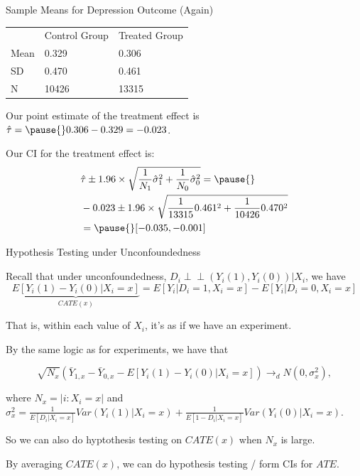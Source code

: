 \documentclass[11pt,english,handout]{beamer}
\newenvironment{wideitemize}{\itemize\addtolength{\itemsep}{10pt}}{\enditemize}
\newcommand{\indep}{\perp\!\!\!\!\perp}
\begin{document}
\begin{frame}{Sample Means for Depression Outcome (Again)}
	
	\begin{tabular}{lll}
		& Control Group & Treated Group \\
		Mean & 0.329 & 0.306\\
		SD & 0.470 &  0.461 \\
		N & 10426 & 13315  
	\end{tabular}
	
	\pause
	\begin{wideitemize}
		\item
		Our point estimate of the treatment effect is $\hat\tau = \pause{} 0.306 - 0.329 = -0.023$.
		
		\pause
		\item
		Our CI for the treatment effect is: 
		\pause
		\begin{align*}
		&\hat\tau \pm 1.96 \times \sqrt{  \frac{1}{N_1}  \hat\sigma_1^2 + \frac{1}{N_0}  \hat\sigma_0^2  } = \pause{} \\ &-0.023 \pm 1.96 \times \sqrt{ \frac{1}{13315} 0.461^2 +  \frac{1}{10426} 0.470^2 } \\ &=  \pause{} [-0.035, -0.001] 
		\end{align*}
		
	\end{wideitemize}
	
\end{frame}




\begin{frame}{Hypothesis Testing under Unconfoundedness}
\begin{wideitemize}
\item
Recall that under unconfoundedness, $D_i \indep (Y_i(1),Y_i(0)) | X_i$, we have
$$ \underbrace{E[Y_i(1) - Y_i(0) | X_i =x]}_{CATE(x)} = E[Y_i | D_i = 1, X_i =x ] - E[Y_i | D_i = 0, X_i =x]$$ 

\noindent That is, within each value of $X_i$, it's as if we have an experiment. 

\pause
\item
By the same logic as for experiments, we have that 

$$\sqrt{N_x} (\bar{Y}_{1,x} -  \bar{Y}_{0,x} - E[Y_i(1) - Y_i(0) | X_i = x]) \rightarrow_d N(0 , \sigma_x^2),$$ 

\noindent where $N_x = |i : X_i = x|$ and 
$\sigma_x^2 = \frac{1}{E[D_i|X_i = x]} Var(Y_i(1) | X_i = x) + \frac{1}{E[1-D_i|X_i=x]} Var(Y_i(0)|X_i =x) $. 

\pause 
\item
So we can also do hyptothesis testing on $CATE(x)$ when $N_x$ is large.

\pause
\item
By averaging $CATE(x)$, we can do hypothesis testing / form CIs for $ATE$. 

\end{wideitemize}	
	
\end{frame}
\end{document}
